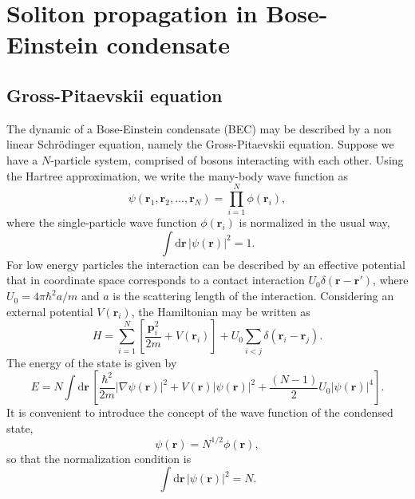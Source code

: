 \chapter{Soliton propagation in Bose-Einstein condensate}


\section{Gross-Pitaevskii equation}
The dynamic of a Bose-Einstein condensate (BEC) may be described by a non linear Schr\"odinger equation, namely the Gross-Pitaevskii equation. Suppose we have a $N$-particle system, comprised of bosons interacting with each other. Using the Hartree approximation, we write the many-body wave function as
\begin{equation}
\psi(\textbf{r}_1, \textbf{r}_2,\ldots, \textbf{r}_N) = \prod_{i=1}^N \phi(\textbf{r}_i),
\end{equation}
where the single-particle wave function $\phi(\textbf{r}_i)$ is normalized in the usual way,
\begin{equation}
\int \mathrm{d}\textbf{r} \, |\psi(\textbf{r})|^2 = 1.
\end{equation} 
For low energy particles the interaction can be described by an effective potential %
that in coordinate space corresponds to a contact interaction $U_0 \delta(\textbf{r} - \textbf{r}')$, where $U_0 = 4 \pi \hbar^2 a / m$ and $a$ is the scattering length of the interaction. Considering an external potential $V(\textbf{r}_i)$, the Hamiltonian may be written as
\begin{equation}
H = \sum_{i=1}^N \left[ \frac{\textbf{p}_i^2}{2 m} + V(\textbf{r}_i) \right] + U_0 \sum_{i<j} \delta(\textbf{r}_i - \textbf{r}_j).
\end{equation}
The energy of the state is given by
\begin{equation}
E =  N \int \mathrm{d} \textbf{r} \, \left[ \frac{\hbar^2}{2m} |\nabla \psi(\textbf{r}) |^2 + V(\textbf{r}) |\psi(\textbf{r})|^2 + \frac{(N-1)}{2} U_0 |\psi(\textbf{r})|^4 \right].
\end{equation} 
It is convenient to introduce the concept of the wave function of the condensed state,
\begin{equation}
\psi(\textbf{r}) = N^{1/2} \phi(\textbf{r}),
\end{equation}
so that the normalization condition is
\begin{equation}
\int \mathrm{d}\textbf{r} \, |\psi(\textbf{r})|^2 = N.
\end{equation}
